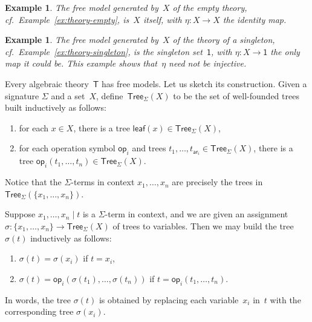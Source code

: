 \documentclass{amsart}
\newcommand{\theory}[1]{\mathsf{#1}} %
\newcommand{\set}[1]{\{#1\}} %
\newcommand{\Tree}[2]{\mathsf{Tree}_{#1}(#2)} %
\newcommand{\leaf}[1]{\mathsf{leaf}(#1)} %
\newcommand{\op}[1]{\mathsf{op}_{#1}} %
\newcommand{\arity}[1]{\mathsf{ar}_{#1}} %
\newcommand{\one}{\mathsf{1}} %
\newtheorem{example}[definition]{Example}
\begin{document}
\begin{example}
  The free model generated by~$X$ of the empty theory, cf.\ Example~\ref{ex:theory-empty},
  is~$X$ itself, with $\eta : X \to X$ the identity map.
\end{example}

\begin{example}
  The free model generated by~$X$ of the theory of a singleton, cf.\
  Example~\ref{ex:theory-singleton}, is the singleton set~$\one$, with $\eta : X \to \one$
  the only map it could be. This example shows that~$\eta$ need not be injective.
\end{example}

Every algebraic theory~$\theory{T}$ has free models. Let us sketch its
construction. Given a signature $\Sigma$ and a set~$X$,
define~$\Tree{\Sigma}{X}$ to be the set of well-founded trees built inductively
as follows:
%
\begin{enumerate}
\item for each $x \in X$, there is a tree $\leaf{x} \in \Tree{\Sigma}{X}$,
\item for each operation symbol $\op{i}$ and trees
  $t_1, \ldots, t_{\arity{i}} \in \Tree{\Sigma}{X}$, there is a tree
  $\op{i}(t_1, \ldots, t_n) \in \Tree{\Sigma}{X}$.
\end{enumerate}
%
Notice that the $\Sigma$-terms in context $x_1, \ldots, x_n$ are precisely the trees
in $\Tree{\Sigma}{\set{x_1, \ldots, x_n}}$.

Suppose $x_1, \ldots, x_n \mid t$ is a $\Sigma$-term in context, and we are
given an assignment $\sigma : \set{x_1, \ldots, x_n} \to \Tree{\Sigma}{X}$ of
trees to variables. Then we may build the tree $\sigma(t)$ inductively as
follows:
%
\begin{enumerate}
\item $\sigma(t) = \sigma(x_i)$ if $t = x_i$,
\item $\sigma(t) = \op{i}(\sigma(t_1), \ldots, \sigma(t_n))$ if
  $t = \op{i}(t_1, \ldots, t_n)$.
\end{enumerate}
%
In words, the tree $\sigma(t)$ is obtained by replacing each variable~$x_i$ in~$t$ with
the corresponding tree $\sigma(x_i)$.
\end{document}
